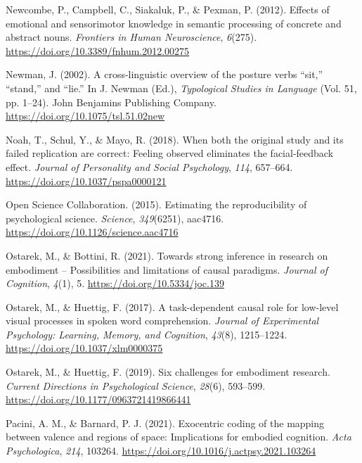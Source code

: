 \documentclass[
  12pt,
  man,floatsintext]{apa7}
\newlength{\cslhangindent}
\newlength{\cslentryspacingunit} %
\newenvironment{CSLReferences}[2] %
 {%
  \setlength{\parindent}{0pt}
  \ifodd #1
  \let\oldpar\par
  \def\par{\hangindent=\cslhangindent\oldpar}
  \fi
  \setlength{\parskip}{#2\cslentryspacingunit}
 }%
 {}
\begin{document}
\begin{CSLReferences}{1}{0}
\leavevmode{}%
Newcombe, P., Campbell, C., Siakaluk, P., \& Pexman, P. (2012). Effects of emotional and sensorimotor knowledge in semantic processing of concrete and abstract nouns. \emph{Frontiers in Human Neuroscience}, \emph{6}(275). \url{https://doi.org/10.3389/fnhum.2012.00275}

\leavevmode{}%
Newman, J. (2002). A cross-linguistic overview of the posture verbs {``sit,''} {``stand,''} and {``lie.''} In J. Newman (Ed.), \emph{Typological {Studies} in {Language}} (Vol. 51, pp. 1--24). {John Benjamins Publishing Company}. \url{https://doi.org/10.1075/tsl.51.02new}

\leavevmode{}%
Noah, T., Schul, Y., \& Mayo, R. (2018). When both the original study and its failed replication are correct: {Feeling} observed eliminates the facial-feedback effect. \emph{Journal of Personality and Social Psychology}, \emph{114}, 657--664. \url{https://doi.org/10.1037/pspa0000121}

\leavevmode{}%
Open Science Collaboration. (2015). Estimating the reproducibility of psychological science. \emph{Science}, \emph{349}(6251), aac4716. \url{https://doi.org/10.1126/science.aac4716}

\leavevmode{}%
Ostarek, M., \& Bottini, R. (2021). Towards strong inference in research on embodiment -- {Possibilities} and limitations of causal paradigms. \emph{Journal of Cognition}, \emph{4}(1), 5. \url{https://doi.org/10.5334/joc.139}

\leavevmode{}%
Ostarek, M., \& Huettig, F. (2017). A task-dependent causal role for low-level visual processes in spoken word comprehension. \emph{Journal of Experimental Psychology: Learning, Memory, and Cognition}, \emph{43}(8), 1215--1224. \url{https://doi.org/10.1037/xlm0000375}

\leavevmode{}%
Ostarek, M., \& Huettig, F. (2019). Six challenges for embodiment research. \emph{Current Directions in Psychological Science}, \emph{28}(6), 593--599. \url{https://doi.org/10.1177/0963721419866441}

\leavevmode{}%
Pacini, A. M., \& Barnard, P. J. (2021). Exocentric coding of the mapping between valence and regions of space: {Implications} for embodied cognition. \emph{Acta Psychologica}, \emph{214}, 103264. \url{https://doi.org/10.1016/j.actpsy.2021.103264}


\end{CSLReferences}
\end{document}
